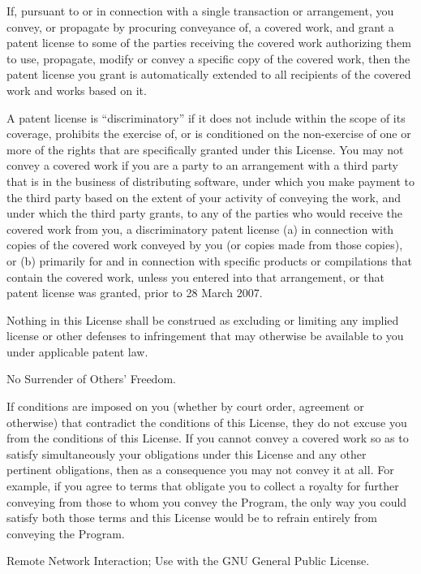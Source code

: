 If, pursuant to or in connection with a single transaction or arrangement, you convey, or propagate by procuring conveyance of, a covered work, and grant a patent license to some of the parties receiving the covered work authorizing them to use, propagate, modify or convey a specific copy of the covered work, then the patent license you grant is automatically extended to all recipients of the covered work and works based on it.

A patent license is ``discriminatory'' if it does not include within the scope of its coverage, prohibits the exercise of, or is conditioned on the non-exercise of one or more of the rights that are specifically granted under this License.  You may not convey a covered work if you are a party to an arrangement with a third party that is in the business of distributing software, under which you make payment to the third party based on the extent of your activity of conveying the work, and under which the third party grants, to any of the parties who would receive the covered work from you, a discriminatory patent license (a) in connection with copies of the covered work conveyed by you (or copies made from those copies), or (b) primarily for and in connection with specific products or compilations that contain the covered work, unless you entered into that arrangement, or that patent license was granted, prior to 28 March 2007.

Nothing in this License shall be construed as excluding or limiting any implied license or other defenses to infringement that may otherwise be available to you under applicable patent law.

\item No Surrender of Others' Freedom.

If conditions are imposed on you (whether by court order, agreement or otherwise) that contradict the conditions of this License, they do not excuse you from the conditions of this License.  If you cannot convey a covered work so as to satisfy simultaneously your obligations under this License and any other pertinent obligations, then as a consequence you may not convey it at all.  For example, if you agree to terms that obligate you to collect a royalty for further conveying from those to whom you convey the Program, the only way you could satisfy both those terms and this License would be to refrain entirely from conveying the Program.

\item Remote Network Interaction; Use with the GNU General Public License.

